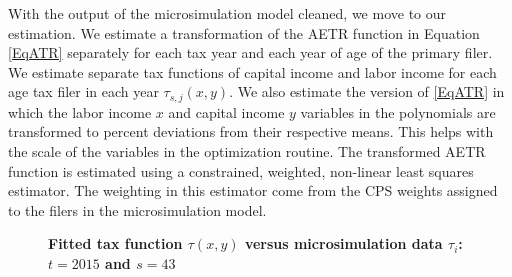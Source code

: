 \documentclass[letterpaper,12pt]{article}
\theoremstyle{definition}
\begin{document}
\begin{spacing}{1.5}
    With the output of the microsimulation model cleaned, we move to our estimation. We estimate a transformation of the AETR function in Equation \eqref{EqATR} separately for each tax year and each year of age of the primary filer. We estimate separate tax functions of capital income and labor income for each age tax filer in each year $\tau_{s,j}(x,y)$. We also estimate the version of \eqref{EqATR} in which the labor income $x$ and capital income $y$ variables in the polynomials are transformed to percent deviations from their respective means. This helps with the scale of the variables in the optimization routine. The transformed AETR function is estimated using a constrained, weighted, non-linear least squares estimator.  The weighting in this estimator come from the CPS weights assigned to the filers in the microsimulation model.

    \begin{figure}[htbp]\centering \captionsetup{width=5.0in}
      \caption{\label{FigMicroTaxEst3D}\textbf{Fitted tax function $\tau(x,y)$ versus microsimulation data $\tau_i$: $t=2015$ and $s=43$}}
    \end{figure}


\end{spacing}
\end{document}
